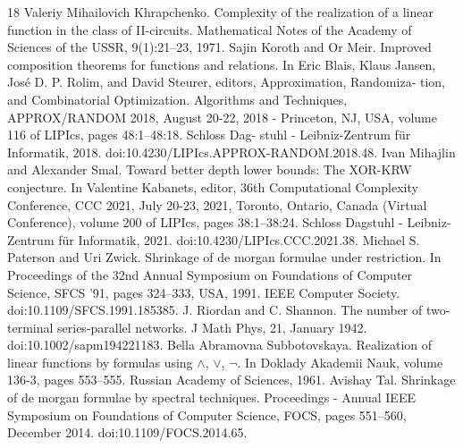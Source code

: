 \documentclass[10pt,a4paper]{article}
\begin{document}
\begin{thebibliography}{18}
 Valeriy Mihailovich Khrapchenko. Complexity of the realization of a linear function in the class of II-circuits. Mathematical Notes of the Academy of Sciences of the USSR, 9(1):21–23, 1971.
 Sajin Koroth and Or Meir. Improved composition theorems for functions and relations. In Eric Blais, Klaus Jansen, José D. P. Rolim, and David Steurer, editors, Approximation, Randomiza- tion, and Combinatorial Optimization. Algorithms and Techniques, APPROX/RANDOM 2018, August 20-22, 2018 - Princeton, NJ, USA, volume 116 of LIPIcs, pages 48:1–48:18. Schloss Dag- stuhl - Leibniz-Zentrum für Informatik, 2018. doi:10.4230/LIPIcs.APPROX-RANDOM.2018.48.
 Ivan Mihajlin and Alexander Smal. Toward better depth lower bounds: The XOR-KRW conjecture. In Valentine Kabanets, editor, 36th Computational Complexity Conference, CCC 2021, July 20-23, 2021, Toronto, Ontario, Canada (Virtual Conference), volume 200 of LIPIcs, pages 38:1–38:24. Schloss Dagstuhl - Leibniz-Zentrum für Informatik, 2021. doi:10.4230/LIPIcs.CCC.2021.38.
 Michael S. Paterson and Uri Zwick. Shrinkage of de morgan formulae under restriction. In Proceedings of the 32nd Annual Symposium on Foundations of Computer Science, SFCS ’91, pages 324–333, USA, 1991. IEEE Computer Society. doi:10.1109/SFCS.1991.185385.
 J. Riordan and C. Shannon. The number of two-terminal series-parallel networks. J Math Phys, 21, January 1942. doi:10.1002/sapm194221183.
 Bella Abramovna Subbotovskaya. Realization of linear functions by formulas using $\wedge$, $\vee$, $\neg$. In Doklady Akademii Nauk, volume 136-3, pages 553–555. Russian Academy of Sciences, 1961.
 Avishay Tal. Shrinkage of de morgan formulae by spectral techniques. Proceedings - Annual IEEE Symposium on Foundations of Computer Science, FOCS, pages 551–560, December 2014. doi:10.1109/FOCS.2014.65.
\end{thebibliography}
\end{document}
